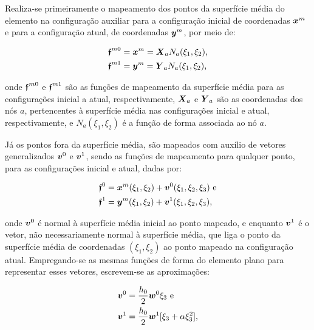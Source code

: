 Realiza-se primeiramente o mapeamento dos pontos da superfície média do elemento na configuração auxiliar para a configuração inicial de coordenadas $\boldsymbol{x}^m$ e para a configuração atual, de coordenadas $\boldsymbol{y}^m$, por meio de:

\begin{subequations}
    \begin{align}
         & \boldsymbol{\mathfrak{f}}^{m0}=\boldsymbol{x}^m=\boldsymbol{X}_aN_a(\xi_1,\xi_2)\text{,} \\
         & \boldsymbol{\mathfrak{f}}^{m1}=\boldsymbol{y}^m=\boldsymbol{Y}_aN_a(\xi_1,\xi_2)\text{,}
    \end{align}
\end{subequations}

\noindent onde $\boldsymbol{\mathfrak{f}}^{m0}$ e $\boldsymbol{\mathfrak{f}}^{m1}$ são as funções de mapeamento da superfície média para as configurações inicial a atual, respectivamente, $\boldsymbol{X}_a$ e $\boldsymbol{Y}_a$ são as coordenadas dos nós $a$, pertencentes à superfície média nas configurações inicial e atual, respectivamente, e $N_a(\xi_1,\xi_2)$ é a função de forma associada ao nó $a$.

Já os pontos fora da superfície média, são mapeados com auxílio de vetores generalizados $\boldsymbol{v}^0$ e $\boldsymbol{v}^1$, sendo as funções de mapeamento para qualquer ponto, para as configurações inicial e atual, dadas por:

\begin{subequations}
    \begin{align}
         & \boldsymbol{\mathfrak{f}}^0=\boldsymbol{x}^m(\xi_1,\xi_2)+\boldsymbol{v}^0(\xi_1,\xi_2,\xi_3)\text{ e} \\
         & \boldsymbol{\mathfrak{f}}^1=\boldsymbol{y}^m(\xi_1,\xi_2)+\boldsymbol{v}^1(\xi_1,\xi_2,\xi_3)\text{,}
    \end{align}
\end{subequations}

\noindent onde $\boldsymbol{v}^0$ é normal à superfície média inicial ao ponto mapeado, e enquanto $\boldsymbol{v}^1$ é o vetor, não necessariamente normal à superfície média, que liga o ponto da superfície média de coordenadas $(\xi_1,\xi_2)$ ao ponto mapeado na configuração atual. Empregando-se as mesmas funções de forma do elemento plano para representar esses vetores, escrevem-se as aproximações:

\begin{subequations}
    \begin{align}
         & \boldsymbol{v}^0=\frac{h_0}{2}\boldsymbol{w}^0\xi_3\text{ e}                \\
         & \boldsymbol{v}^1=\frac{h_0}{2}\boldsymbol{w}^1[\xi_3+\alpha\xi_3^2]\text{,}
    \end{align}
\end{subequations}

